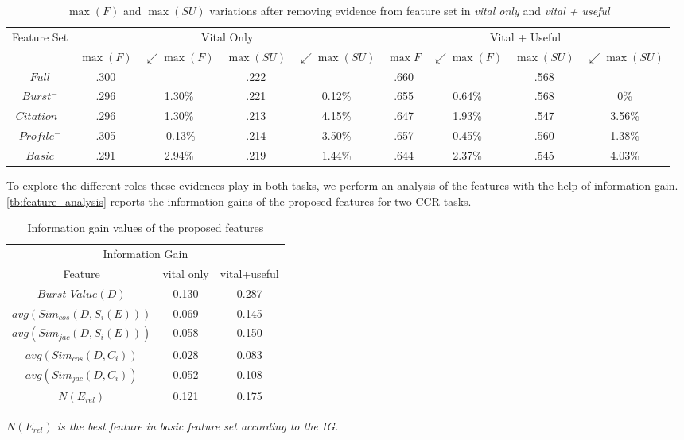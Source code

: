 \documentclass{sig-alternate}
\begin{document}
\begin{table*}[thbp]
\centering
\caption{$\max(F)$ and $\max(SU)$ variations after removing evidence from feature set in \textit{vital only} and \textit{vital + useful}}\label{tb:variation-F-SU}
\begin{tabular}{ccccc|cccc} \hline
\multirow{2}{*}{Feature Set} & \multicolumn{4}{c|}{Vital Only} & \multicolumn{4}{c}{Vital + Useful} \\ \cline{2-9}
  & $\max(F)$ & $\swarrow \max(F)$ &  $\max(SU)$ & $\swarrow \max(SU)$   & $\max{ F}$ & $\swarrow \max(F)$ & $\max(SU)$ & $\swarrow \max(SU)$  \\ \hline
 $Full$ & .300&  & .222 & & .660 &  & .568 &  \\ 
 $Burst^{-}$ &.296 &1.30\% & .221 & 0.12\% &.655 & 0.64\% &.568 & 0\% \\
 $Citation^{-}$ & .296& 1.30\% & .213 & 4.15\%  & .647& 1.93\% & .547 & 3.56\% \\ 
 $Profile^{-}$& .305& -0.13\% & .214& 3.50\% & .657 & 0.45\% & .560 & 1.38\% \\ 
 $Basic$  &.291 & 2.94\% & .219 & 1.44\% & .644 & 2.37\% & .545 & 4.03\% \\ \hline
\end{tabular}
\end{table*}

To explore the different roles these evidences play in both tasks, we perform an analysis of the features with the help of information gain. \autoref{tb:feature_analysis} reports the information gains of the proposed features for two CCR tasks.
\begin{table}[thbp]
\centering
\caption{Information gain values of the proposed features}
\label{tb:feature_analysis}
\begin{tabular}{ccc} \hline
\multicolumn{3}{c}{Information Gain} \\
 Feature & vital only & vital+useful \\ \hline
 $Burst\_Value(D)$ & 0.130 & 0.287 \\ \hline
$avg(Sim_{cos}(D, S_{i}(E)))$ &0.069  &0.145 \\
$avg(Sim_{jac}(D, S_{i}(E)))$ & 0.058  & 0.150 \\ \hline
$avg(Sim_{cos}(D, C_{i}))$ & 0.028 &  0.083  \\
$avg(Sim_{jac}(D, C_{i}))$ & 0.052 & 0.108  \\ \hline
$N(E_{rel})$ & 0.121 & 0.175\\ \hline
\end{tabular}
\textit{$N(E_{rel})$ is the best feature in basic feature set according to the IG.}
\end{table}
\end{document}
